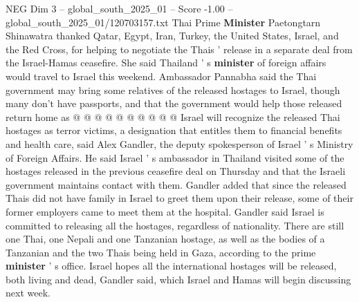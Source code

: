 \begin{textsample}{NEG Dim 3 – global\_south\_2025\_01 – Score -1.00 – global\_south\_2025\_01/120703157.txt}
Thai Prime \textbf{Minister} Paetongtarn Shinawatra thanked Qatar, Egypt, Iran, Turkey, the United States, Israel, and the Red Cross, for helping to negotiate the Thais ' release in a separate deal from the Israel-Hamas ceasefire.
She said Thailand ' s \textbf{minister} of foreign affairs would travel to Israel this weekend.
Ambassador Pannabha said the Thai government may bring some relatives of the released hostages to Israel, though many don't have passports, and that the government would help those released return home as @ @ @ @ @ @ @ @ @ @ Israel will recognize the released Thai hostages as terror victims, a designation that entitles them to financial benefits and health care, said Alex Gandler, the deputy spokesperson of Israel ' s Ministry of Foreign Affairs.
He said Israel ' s ambassador in Thailand visited some of the hostages released in the previous ceasefire deal on Thursday and that the Israeli government maintains contact with them.
Gandler added that since the released Thais did not have family in Israel to greet them upon their release, some of their former employers came to meet them at the hospital.
Gandler said Israel is committed to releasing all the hostages, regardless of nationality.
There are still one Thai, one Nepali and one Tanzanian hostage, as well as the bodies of a Tanzanian and the two Thais being held in Gaza, according to the prime \textbf{minister} ' s office.
Israel hopes all the international hostages will be released, both living and dead, Gandler said, which Israel and Hamas will begin discussing next week.

\end{textsample}
